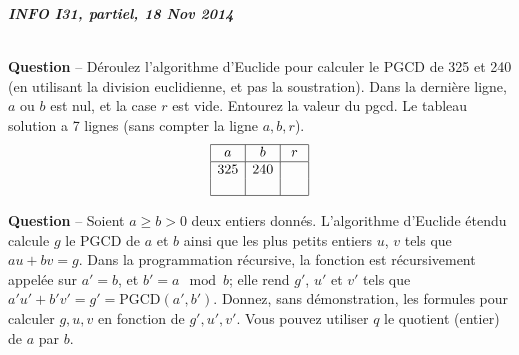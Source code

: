 \documentclass[12pt]{article}
\newcounter{QNumber}
\newcommand{\Question}[2][ ]{
 \stepcounter{QNumber}
  \noindent\textbf{Question \theQNumber} --
  #2~#1}
\begin{document}
  \begin{center}
    \bfseries\LARGE
    \textit{INFO I31, partiel, 18 Nov 2014}\large
  \end{center}
  \sffamily
\setlength\parskip{0.2cm} 





~\\

\Question{D\'eroulez l'algorithme d'Euclide pour calculer le PGCD de 325 et 240 (en utilisant la division euclidienne, et pas la soustration).
Dans la dernière ligne, $a$ ou $b$ est nul, et la case  $r$ est vide.
Entourez la valeur du pgcd. Le tableau solution  a 7 lignes (sans compter la ligne $a, b, r$).}
$$
\begin{array}{|c|c|c|}
\hline
\; a\; & \; b\; & \; r\; \\
\hline
325 & 240 & \quad \\
    &     & \\
\hline
\end{array}$$

\Question{Soient $a \ge b > 0$ deux entiers donnés. L'algorithme d'Euclide étendu 
calcule $g$ le PGCD de $a$ et $b$ ainsi que les plus petits entiers $u$, $v$ tels que $au+bv=g$. Dans la programmation récursive, la fonction est récursivement appelée sur $a'=b$, et $b'=a \mod b$; elle rend $g'$, $u'$ et $v'$ tels que
$a'u'+b'v'=g'=\mbox{PGCD}(a',b')$. Donnez, sans démonstration,  les formules
pour calculer  $g, u, v$ en fonction de $g', u', v'$. Vous pouvez utiliser $q$ le quotient (entier) de $a$ par $b$.}
\end{document}
